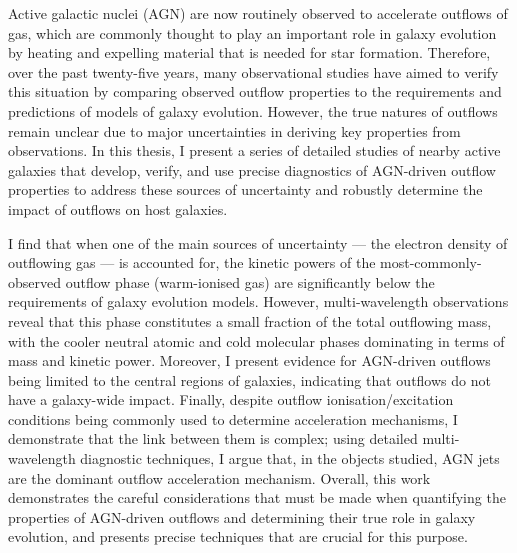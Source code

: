 Active galactic nuclei (AGN) are now routinely observed to accelerate outflows of gas, which are commonly thought to play an important role in galaxy evolution by heating and expelling material that is needed for star formation. Therefore, over the past twenty-five years, many observational studies have aimed to verify this situation by comparing observed outflow properties to the requirements and predictions of models of galaxy evolution. However, the true natures of outflows remain unclear due to major uncertainties in deriving key properties from observations. In this thesis, I present a series of detailed studies of nearby active galaxies that develop, verify, and use precise diagnostics of AGN-driven outflow properties to address these sources of uncertainty and robustly determine the impact of outflows on host galaxies. 

I find that when one of the main sources of uncertainty --- the electron density of outflowing gas --- is accounted for, the kinetic powers of the most-commonly-observed outflow phase (warm-ionised gas) are significantly below the requirements of galaxy evolution models. However, multi-wavelength observations reveal that this phase constitutes a small fraction of the total outflowing mass, with the cooler neutral atomic and cold molecular phases dominating in terms of mass and kinetic power. Moreover, I present evidence for AGN-driven outflows being limited to the central regions of galaxies, indicating that outflows do not have a galaxy-wide impact. Finally, despite outflow ionisation/excitation conditions being commonly used to determine acceleration mechanisms, I demonstrate that the link between them is complex; using detailed multi-wavelength diagnostic techniques, I argue that, in the objects studied, AGN jets are the dominant outflow acceleration mechanism. Overall, this work demonstrates the careful considerations that must be made when quantifying the properties of AGN-driven outflows and determining their true role in galaxy evolution, and presents precise techniques that are crucial for this purpose.